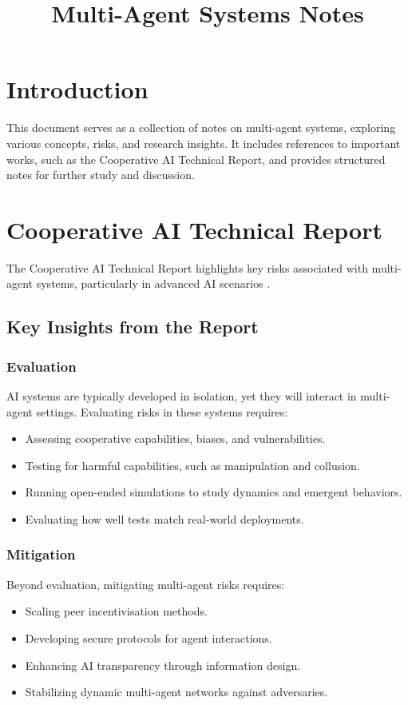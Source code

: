 \documentclass{article}
\begin{document}
\title{Multi-Agent Systems Notes}
\author{}
\date{}
\maketitle

\section{Introduction}

This document serves as a collection of notes on multi-agent systems, exploring various concepts, risks, and research insights. It includes references to important works, such as the Cooperative AI Technical Report, and provides structured notes for further study and discussion. 

\section{Cooperative AI Technical Report}

The Cooperative AI Technical Report highlights key risks associated with multi-agent systems, particularly in advanced AI scenarios \citep{cooperative2025}. 

\subsection{Key Insights from the Report}

\subsubsection{Evaluation}
AI systems are typically developed in isolation, yet they will interact in multi-agent settings. Evaluating risks in these systems requires:
\begin{itemize}
    \item Assessing cooperative capabilities, biases, and vulnerabilities.
    \item Testing for harmful capabilities, such as manipulation and collusion.
    \item Running open-ended simulations to study dynamics and emergent behaviors.
    \item Evaluating how well tests match real-world deployments.
\end{itemize}

\subsubsection{Mitigation}
Beyond evaluation, mitigating multi-agent risks requires:
\begin{itemize}
    \item Scaling peer incentivisation methods.
    \item Developing secure protocols for agent interactions.
    \item Enhancing AI transparency through information design.
    \item Stabilizing dynamic multi-agent networks against adversaries.
\end{itemize}
\end{document}
